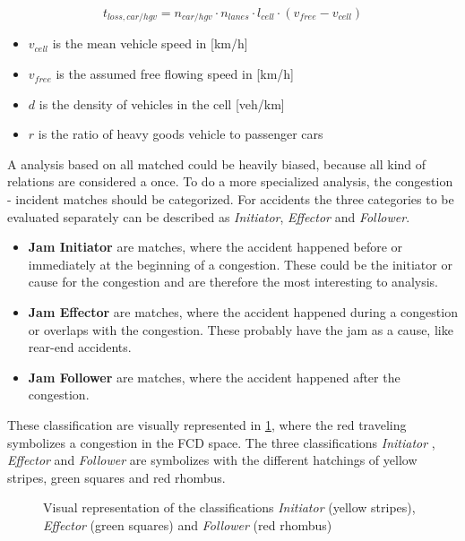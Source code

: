 \begin{equation}
	t_{loss,car/hgv} = n_{car/hgv} \cdot n_{lanes} \cdot l_{cell} \cdot ( v_{free} - v_{cell})
	\label{equation_timeloss}
\end{equation}
\begin{itemize}
	\setlength\itemsep{0.01em}	
	\item[] $v_{cell}$ is the mean vehicle speed in [km/h]
	\item[] $v_{free}$ is the assumed free flowing speed in [km/h]
	\item[] $d$ is the density of vehicles in the cell [veh/km]
	\item[] $r$ is the ratio of heavy goods vehicle to passenger cars 
\end{itemize}

\bigskip

A analysis based on all matched could be heavily biased, because all kind of relations are considered a once. To do a more specialized analysis, the congestion - incident matches should be categorized. For accidents the three categories to be evaluated separately can be described as \textit{Initiator}, \textit{Effector} and \textit{Follower}.
\begin{itemize}
	\setlength\itemsep{0.1em}	
	\item[] \textbf{Jam Initiator} are matches, where the accident happened before or immediately at the beginning of a congestion. These could be the initiator or cause for the congestion and are therefore the most interesting to analysis.
	\item[] \textbf{Jam Effector} are matches, where the accident happened during a congestion or overlaps with the congestion. These probably have the jam as a cause, like rear-end accidents.
	\item[] \textbf{Jam Follower} are matches, where the accident happened after the congestion. 
\end{itemize}

These classification are visually represented in \cref{img:jam_classifation}, where the red traveling symbolizes a congestion in the FCD space. The three classifications \textit{Initiator} , \textit{Effector}  and \textit{Follower}  are symbolizes with the different hatchings of yellow stripes, green squares and red rhombus.
\begin{figure}[ht]
	\centering	
	
	\vspace{-4mm}
	\caption{Visual representation of the classifications \textit{Initiator} (yellow stripes), \textit{Effector} (green squares) and \textit{Follower} (red rhombus)}
	\label{img:jam_classifation}
	\vspace{-4mm}
\end{figure}

